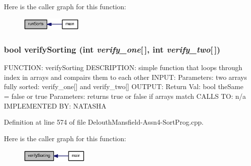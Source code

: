 Here is the caller graph for this function:\nopagebreak
\begin{figure}[H]
\begin{center}
\leavevmode
\includegraphics[width=86pt]{_delouth_mansfield-_assn4-_sort_prog_8cpp_acd0f7b42076b153145b2198ffad4a0c2_icgraph}
\end{center}
\end{figure}


\hypertarget{_delouth_mansfield-_assn4-_sort_prog_8cpp_ae2cf0cca1e089e83ae98750b96b8cf11}{
\subsubsection[{verifySorting}]{\setlength{\rightskip}{0pt plus 5cm}bool verifySorting (int {\em verify\_\-one}\mbox{[}$\,$\mbox{]}, \/  int {\em verify\_\-two}\mbox{[}$\,$\mbox{]})}}
\label{_delouth_mansfield-_assn4-_sort_prog_8cpp_ae2cf0cca1e089e83ae98750b96b8cf11}
FUNCTION: verifySorting DESCRIPTION: simple function that loops through index in arrays and compairs them to each other INPUT: Parameters: two arrays fully sorted: verify\_\-one\mbox{[}\mbox{]} and verify\_\-two\mbox{[}\mbox{]} OUTPUT: Return Val: bool theSame = false or true Parameters: returns true or false if arrays match CALLS TO: n/a IMPLEMENTED BY: NATASHA 

Definition at line 574 of file DelouthMansfield-\/Assn4-\/SortProg.cpp.



Here is the caller graph for this function:\nopagebreak
\begin{figure}[H]
\begin{center}
\leavevmode
\includegraphics[width=95pt]{_delouth_mansfield-_assn4-_sort_prog_8cpp_ae2cf0cca1e089e83ae98750b96b8cf11_icgraph}
\end{center}
\end{figure}




